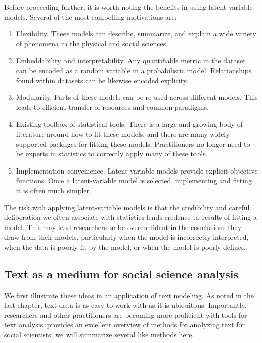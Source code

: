 Before proceeding further, it is worth noting the benefits in using
latent-variable models.  Several of the most compelling motivations are:

\begin{enumerate}
\item Flexibility. These models can describe, summarize, and explain
  a wide variety of phenomena in the physical and social sciences.
\item Embeddability and interpretability.  Any quantifiable metric
  in the dataset can be encoded as a random variable in a
  probabilistic model.  Relationships
  found within datasets can be likewise encoded
  explicity. \label{lvm:matching}
\item Modularity. Parts of these models can be re-used across
  different models.  This leads to efficient transfer of resources
  and common paradigms.
\item Existing toolbox of statistical tools. There is a large and
  growing body of literature around how to fit these models, and
  there are many widely supported packages for fitting these
  models.  Practitioners no longer need to be experts in
  statistics to correctly apply many of these tools.
\item Implementation convenience.  Latent-variable models provide
  explicit objective functions.  Once a latent-variable model is
  selected, implementing and fitting it is often much simpler.
\end{enumerate}

  The risk with applying latent-variable models is that the
  credibility and careful deliberation we often associate with
  statistics lends credence to results of fitting a model.  This may
  lead researchers to be overconfident in the conclusions they draw
  from their models, particularly when the model is incorrectly
  interpreted, when the data is poorly fit by the model, or when the
  model is poorly defined.

\subsection{Text as a medium for social science analysis}
  \label{sec:text_intro}
  We first illustrate these ideas in an application of text modeling.
  As noted in the last chapter, text data is as easy to work with as
  it is ubiquitous. Importantly, researchers and other practitioners
  are becoming more proficient with tools for text analysis.
  \cite{grimmer:submitted} provides an excellent overview of methods
  for analyzing text for social scientists; we will summarize several
  like methods here.

